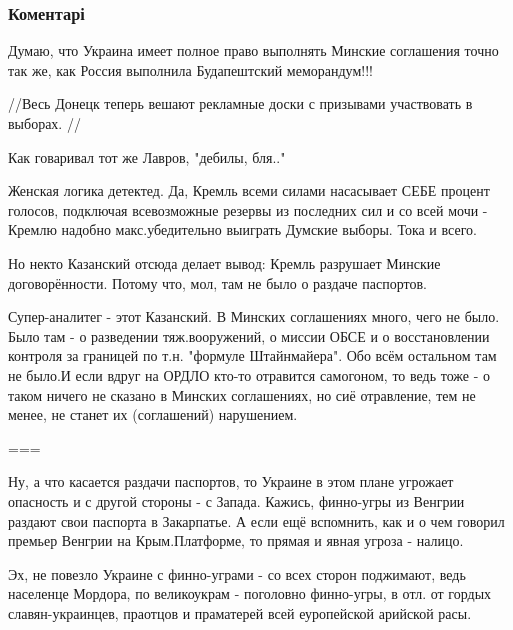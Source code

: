  
 
 
 
 
\subsubsection{Коментарі}
\label{sec:07_09_2021.fb.kazanskij_denis.1.moskva_minsk_dogovor.cmt}

\begin{itemize} %
Думаю, что Украина имеет полное право выполнять Минские соглашения точно так
же, как Россия выполнила Будапештский меморандум!!!



//Весь Донецк теперь вешают рекламные доски с призывами участвовать в выборах. //

Как говаривал тот же Лавров, "дебилы, бля.."

Женская логика детектед. Да, Кремль всеми силами насасывает СЕБЕ процент
голосов, подключая всевозможные резервы из последних сил и со всей мочи -
Кремлю надобно макс.убедительно выиграть Думские выборы. Тока и всего.

Но некто Казанский отсюда делает вывод: Кремль разрушает Минские
договорённости. Потому что, мол, там не было о раздаче паспортов.

Супер-аналитег - этот Казанский. В Минских соглашениях много, чего не было.
Было там - о разведении тяж.вооружений, о миссии ОБСЕ и о восстановлении
контроля за границей по т.н. "формуле Штайнмайера". Обо всём остальном там не
было.И если вдруг на ОРДЛО кто-то отравится самогоном, то ведь тоже - о таком
ничего не сказано в Минских соглашениях, но сиё отравление, тем не менее, не
станет их (соглашений) нарушением.

===

Ну, а что касается раздачи паспортов, то Украине в этом плане угрожает
опасность и с другой стороны - с Запада. Кажись, финно-угры из Венгрии раздают
свои паспорта в Закарпатье. А если ещё вспомнить, как и о чем говорил премьер
Венгрии на Крым.Платформе, то прямая и явная угроза - налицо.

Эх, не повезло Украине с финно-уграми - со всех сторон поджимают, ведь
населенце Мордора, по великоукрам - поголовно финно-угры, в отл. от гордых
славян-украинцев, праотцов и праматерей всей еуропейской арийской расы.


\end{itemize}
